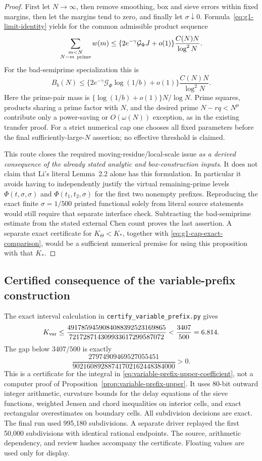 \documentclass[11pt]{article}
\begin{document}
\begin{proof}
First let $N\to\infty$, then remove smoothing, box and sieve
errors within fixed margins, then let the margins tend to zero,
and finally let $\sigma\downarrow0$.
Formula~\eqref{eq:g1-limit-identity} yields
for the common admissible product sequence
\[
 \sum_{\substack{m<N\\N-m\ {\rm prime}}}w(m)
 \le\{2e^{-\gamma}\mathcal G_\Phi J+o(1)\}
             \frac{C(N)N}{\log^2N}.
\]
For the bad-semiprime specialization this is
\[
 B_b(N)\le
  \{2e^{-\gamma}\mathcal G_\Phi\log(1/b)+o(1)\}
             \frac{C(N)N}{\log^2N}.
\]
Here the prime-pair mass is
$\{\log(1/b)+o(1)\}N/\log N$.
Prime squares, products sharing a prime factor with $N$, and
the desired prime $N-rq<N^\mu$ contribute only a power-saving
or $O(\omega(N))$ exception, as in the existing transfer proof.
For a strict numerical cap one chooses all fixed parameters
before the final sufficiently-large-$N$ assertion; no effective
threshold is claimed.

This route closes the required moving-residue/local-scale issue
\emph{as a derived consequence of the already stated analytic
and box-construction inputs}. It does not claim that Li's literal
Lemma~2.2 alone has this formulation. In particular it avoids
having to independently justify the virtual remaining-prime
levels $\Phi(t,\sigma,\sigma)$ and $\Phi(t_1,t_2,\sigma)$ for
the first two nonempty prefixes. Reproducing the exact finite
$\sigma=1/500$ printed functional solely from literal source
statements would still require that separate interface check.
Subtracting the bad-semiprime estimate from the stated external
Chen count proves the last assertion. A separate exact
certificate for $K_\Theta<K_*$, together with
\eqref{eq:g1-cap-exact-comparison}, would be a sufficient
numerical premise for using this proposition with that $K_*$.
\end{proof}

\subsection{Certified consequence of the variable-prefix construction}
\label{sec:variable-prefix-corollary}
The exact interval calculation in
\texttt{certify\_variable\_prefix.py} gives
\[
 K_{\rm var}\le
 \frac{4917859459084088392523169865}{721728714309933617299587072}
 <\frac{3407}{500}=6.814.
\]
The gap below $3407/500$ is exactly
\[
 \frac{27974909469527055451}{90216089288741702162448384000}>0.
\]
This is a certificate for the integral in
\eqref{eq:variable-prefix-upper-coefficient}, not a computer proof
of Proposition~\ref{prop:variable-prefix-upper}.
It uses 80-bit outward integer arithmetic, curvature bounds for
the delay equations of the sieve functions, weighted Jensen and
chord inequalities on interior cells, and exact rectangular
overestimates on boundary cells. All subdivision decisions are exact.
The final run used 995,180 subdivisions. A separate driver replayed
the first 50,000 subdivisions with identical rational endpoints.
The source, arithmetic dependency, and review hashes accompany the
certificate. Floating values are used only for display.
\end{document}
